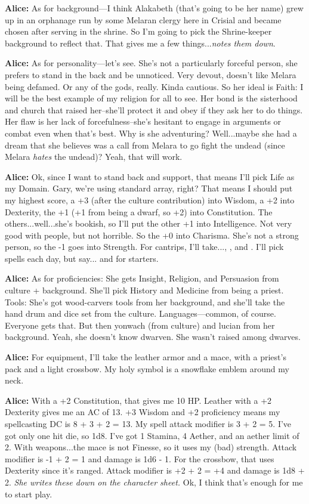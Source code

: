 \textbf{Alice:} As for background---I think Alakabeth (that's going to be her name) grew up in an orphanage run by some Melaran clergy here in Crisial and became chosen after serving in the shrine. So I'm going to pick the Shrine-keeper background to reflect that. That gives me a few things...\textit{notes them down}.

\textbf{Alice:} As for personality---let's see. She's not a particularly forceful person, she prefers to stand in the back and be unnoticed. Very devout, doesn't like Melara being defamed. Or any of the gods, really. Kinda cautious. So her ideal is Faith: I will be the best example of my religion for all to see. Her bond is the sisterhood and church that raised her--she'll protect it and obey if they ask her to do things. Her flaw is her lack of forcefulness--she's hesitant to engage in arguments or combat even when that's best. Why is she adventuring? Well...maybe she had a dream that she believes was a call from Melara to go fight the undead (since Melara \textit{hates} the undead)? Yeah, that will work.

\textbf{Alice:} Ok, since I want to stand back and support, that means I'll pick Life as my Domain. Gary, we're using standard array, right? That means I should put my highest score, a +3 (after the culture contribution) into Wisdom, a +2 into Dexterity, the +1 (+1 from being a dwarf, so +2) into Constitution. The others...well...she's bookish, so I'll put the other +1 into Intelligence. Not very good with people, but not horrible. So the +0 into Charisma. She's not a strong person, so the -1 goes into Strength. For cantrips, I'll take..., , and . I'll pick spells each day, but say... and  for starters.

\textbf{Alice:} As for proficiencies: She gets Insight, Religion, and Persuasion from culture + background. She'll pick History and Medicine from being a priest. Tools: She's got wood-carvers tools from her background, and she'll take the hand drum and dice set from the culture. Languages---common, of course. Everyone gets that. But then yonwach (from culture) and lucian from her background. Yeah, she doesn't know dwarven. She wasn't raised among dwarves.

\textbf{Alice:} For equipment, I'll take the leather armor and a mace, with a priest's pack and a light crossbow. My holy symbol is a snowflake emblem around my neck.

\textbf{Alice:} With a +2 Constitution, that gives me 10 HP. Leather with a +2 Dexterity gives me an AC of 13. +3 Wisdom and +2 proficiency means my spellcasting DC is 8 + 3 + 2 = 13. My spell attack modifier is 3 + 2 = 5. I've got only one hit die, so 1d8. I've got 1 Stamina, 4 Aether, and an aether limit of 2. With weapons...the mace is not Finesse, so it uses my (bad) strength. Attack modifier is -1 + 2 = 1 and damage is 1d6 - 1. For the crossbow, that uses Dexterity since it's ranged. Attack modifier is +2 + 2 = +4 and damage is 1d8 + 2. \textit{She writes these down on the character sheet.} Ok, I think that's enough for me to start play.

